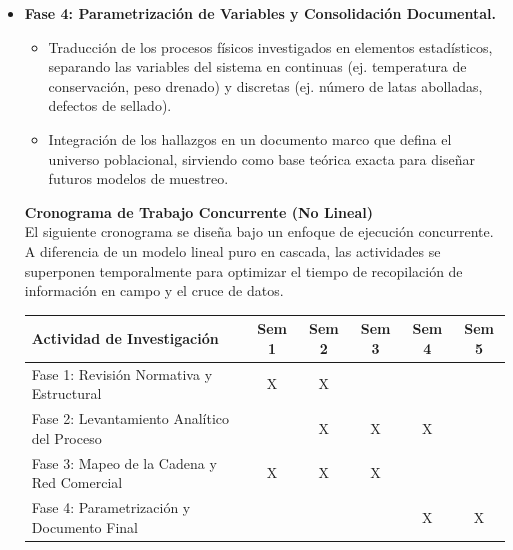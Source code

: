 \documentclass[11pt,a4paper]{article}
\begin{document}
\begin{itemize}
    \item \textbf{Fase 4: Parametrización de Variables y Consolidación Documental.}
    \begin{itemize}[noitemsep, label=-]
        \item Traducción de los procesos físicos investigados en elementos estadísticos, separando las variables del sistema en continuas (ej. temperatura de conservación, peso drenado) y discretas (ej. número de latas abolladas, defectos de sellado).
        \item Integración de los hallazgos en un documento marco que defina el universo poblacional, sirviendo como base teórica exacta para diseñar futuros modelos de muestreo.
    \end{itemize}


    
\vspace{0.5cm}
\noindent \textbf{Cronograma de Trabajo Concurrente (No Lineal)} \\
El siguiente cronograma se diseña bajo un enfoque de ejecución concurrente. A diferencia de un modelo lineal puro en cascada, las actividades se superponen temporalmente para optimizar el tiempo de recopilación de información en campo y el cruce de datos.

\begin{table}[h!]
\centering
\renewcommand{\arraystretch}{1.5}
\begin{tabular}{|p{7.5cm}|c|c|c|c|c|}
\hline
\textbf{Actividad de Investigación} & \textbf{Sem 1} & \textbf{Sem 2} & \textbf{Sem 3} & \textbf{Sem 4} & \textbf{Sem 5} \\ \hline
Fase 1: Revisión Normativa y Estructural & \cellcolor{blue!20}X & \cellcolor{blue!20}X & & & \\ \hline
Fase 2: Levantamiento Analítico del Proceso & & \cellcolor{green!20}X & \cellcolor{green!20}X & \cellcolor{green!20}X & \\ \hline
Fase 3: Mapeo de la Cadena y Red Comercial & \cellcolor{orange!20}X & \cellcolor{orange!20}X & \cellcolor{orange!20}X & & \\ \hline
Fase 4: Parametrización y Documento Final & & & & \cellcolor{red!20}X & \cellcolor{red!20}X \\ \hline
\end{tabular}
\end{table}



\end{itemize}
\end{document}
